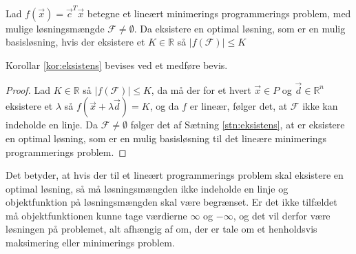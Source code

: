 \begin{kor}
Lad $f(\vec{x}) = \vec{c}^T\vec{x}$ betegne et lineært minimerings programmerings problem, med mulige løsningsmængde $\mathcal{F} \neq \emptyset$. 
Da eksistere en optimal løsning, som er en mulig basisløsning, hvis der eksistere et $K \in \mathds{R}$ så $|f(\mathcal{F})| \leq K$ 
\label{kor:eksistens}
\end{kor}
Korollar \ref{kor:eksistens} bevises ved et medføre bevis.
\begin{proof}
Lad  $K \in \mathds{R}$ så $|f(\mathcal{F})| \leq K$, da må der for et hvert $\vec{x} \in P$ og $\vec{d} \in \mathds{R}^n$ eksistere et $\lambda$ så $f(\vec{x}+\lambda \vec{d}) = K$, og da $f$ er lineær, følger det, at $\mathcal{F}$ ikke kan indeholde en linje. 
Da $\mathcal{F} \neq \emptyset$ følger det af Sætning \ref{stn:eksistens}, at er eksistere en optimal løsning, som er en mulig basisløsning til det lineære minimerings programmerings problem.
\end{proof}
Det betyder, at hvis der til et lineært programmerings problem skal eksistere en optimal løsning, så må løsningsmængden ikke indeholde en linje og objektfunktion på løsningsmængden skal være begrænset. 
Er det ikke tilfældet må objektfunktionen kunne tage værdierne $\infty$ og $-\infty$, og det vil derfor være løsningen på problemet, alt afhængig af om, der er tale om et henholdsvis maksimering eller minimerings problem.

